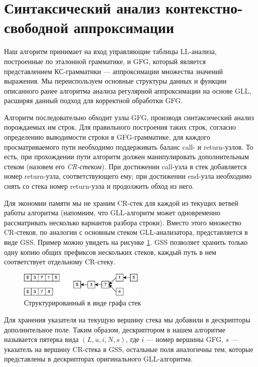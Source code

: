\section{Синтаксический анализ контекстно-свободной аппроксимации}

Наш алгоритм принимает на вход управляющие таблицы LL-анализа, построенные по эталонной грамматике, и GFG, который является представлением КС-грамматики --- аппроксимации множества значений выражения. 
Мы переиспользуем основные структуры данных и функции описанного ранее алгоритма анализа регулярной аппроксимации на основе GLL, расширяя данный подход для корректной обработки GFG.

Алгоритм последовательно обходит узлы GFG, производя синтаксический анализ порождаемых им строк. 
Для правильного построения таких строк, согласно определению выводимости строки в GFG-грамматике, для каждого просматриваемого пути необходимо поддерживать баланс call- и return-узлов. 
То есть, при прохождении пути алгоритм должен манипулировать дополнительным стеком (назовем его \textit{CR-стеком}). 
При достижении call-узла в стек добавляется номер return-узла, соответствующего ему; при достижении end-узла необходимо снять со стека номер return-узла и продолжить обход из него. 

Для экономии памяти мы не храним CR-стек для каждой из текущих ветвей работы алгоритма (напомним, что GLL-алгоритм может одновременно рассматривать несколько вариантов разбора строки). 
Вместо этого множество CR-стеков, по аналогии с основным стеком GLL-анализатора, представляется в виде GSS. 
Пример можно увидеть на рисунке \ref{fig:gss}. GSS позволяет хранить только одну копию общих префиксов нескольких стеков, каждый путь в нем соответствует отдельному CR-стеку.

\begin{figure}[h]
	\centering
	\includegraphics[width=6cm]{pictures/kovalev-spbu-gss_cr}
	\caption{Структурированный в виде графа стек}
	\label{fig:gss}
\end{figure}

Для хранения указателя на текущую вершину стека мы добавили в дескрипторы дополнительное поле. 
Таким образом, дескриптором в нашем алгоритме называется пятерка вида $(L, u, i, N, s)$, где $i$ --- номер вершины GFG, $s$ --- указатель на вершину CR-стека в GSS, остальные поля аналогичны тем, которые представлены в дескрипторах оригинального GLL-алгоритма.

